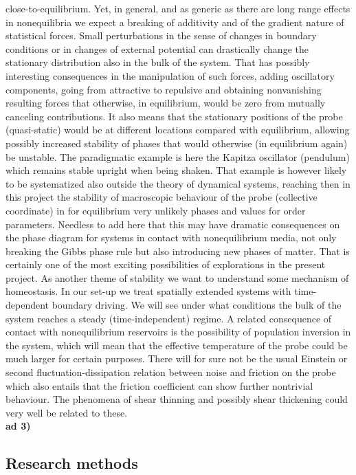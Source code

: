 close-to-equilibrium.   Yet, in general, and as generic as there are long range effects in nonequilibria we expect a breaking of additivity and of the gradient nature of statistical forces. Small perturbations in the sense of changes in boundary conditions or in changes of external potential can drastically change the stationary distribution also in the bulk of the system.  That has possibly interesting consequences in the manipulation of such forces, adding oscillatory components, going from attractive to repulsive and obtaining nonvanishing resulting forces that otherwise, in equilibrium, would be zero from mutually canceling contributions. 
It also means that the stationary positions of the probe (quasi-static) would be at different locations compared with equilibrium, allowing possibly increased stability of phases that would otherwise (in equilibrium again) be unstable.  The paradigmatic example is here the Kapitza oscillator (pendulum) which remains stable upright when being shaken.  That example is however likely to be systematized also outside the theory of dynamical systems, reaching then in this project the stability of macroscopic behaviour of the probe (collective coordinate) in for equilibrium very unlikely phases and values for order parameters.  Needless to  add here that this may have dramatic consequences on the phase diagram for systems in contact with nonequilibrium media, not only breaking the Gibbs phase rule but also introducing new phases of matter.  That is certainly one of the most exciting possibilities of explorations in the present project. As another theme of stability we want to understand some mechanism of homeostasis. In our set-up we treat spatially extended systems with time-dependent boundary driving. We will see under what conditions the bulk of the system reaches a steady (time-independent) regime. A related consequence of contact with nonequilibrium reservoirs is the possibility of population inversion in the system, which will mean that the effective temperature of the probe could be much larger for certain purposes.  There will for sure not be the usual Einstein or second fluctuation-dissipation relation between noise and friction on the probe which also entails that the friction coefficient can show further nontrivial behaviour.  The phenomena of shear thinning and possibly shear thickening could very well be related to these.\\
{\bf ad 3)} 



\subsection{Research methods}\label{sec:methods}

